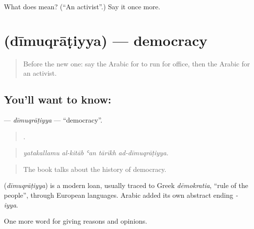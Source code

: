 \begin{tcolorbox}[breakable,colback=teal!4,colframe=teal!35!black,title={Before you move on}]
What does  mean? (\textquotedblleft{}An activist\textquotedblright{}.) Say it once more.
\end{tcolorbox}
\section[\texorpdfstring{\ar{ديمقراطية} (dīmuqrāṭiyya)}{ديمقراطية (dīmuqrāṭiyya)}]{ (dīmuqrāṭiyya) — democracy}

\label{lesson:AR-C379-dimuqratiyya}



\begin{quote}
Before the new one: say the Arabic for to run for office, then the Arabic for an activist.
\end{quote}

\subsection*{You'll want to know: }
\textbf{} — \emph{dīmuqrāṭiyya} — \textquotedblleft{}democracy\textquotedblright{}.

\begin{quote}
    .
\end{quote}

\begin{quote}
\emph{yatakallamu al-kitāb ʿan tārīkh ad-dīmuqrāṭiyya.}
\end{quote}

\begin{quote}
The book talks about the history of democracy.
\end{quote}

\begin{cousinweb}
\textbf{} (\emph{dīmuqrāṭiyya}) is a modern loan, usually traced to Greek \emph{dēmokratia}, \textquotedblleft{}rule of the people\textquotedblright{}, through European languages. Arabic added its own abstract ending \emph{-iyya}.
\end{cousinweb}

\begin{grammarlens}[title={What you've built}]
One more word for giving reasons and opinions.
\end{grammarlens}

